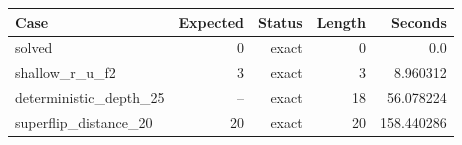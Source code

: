 {\small
\begin{tabular}{lrrrr}
\hline
Case & Expected & Status & Length & Seconds \\
\hline
solved & 0 & exact & 0 & 0.0 \\
shallow\_r\_u\_f2 & 3 & exact & 3 & 8.960312 \\
deterministic\_depth\_25 & -- & exact & 18 & 56.078224 \\
superflip\_distance\_20 & 20 & exact & 20 & 158.440286 \\
\hline
\end{tabular}
}
